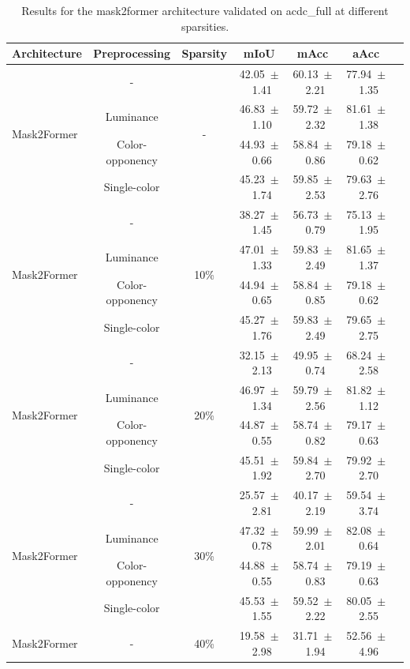 \begin{table}[h]
\centering
\caption{Results for the mask2former architecture validated on acdc_full at different sparsities.}
\begin{tabular}{@{}lccc ccc@{}}
\toprule
Architecture & Preprocessing & Sparsity & mIoU & mAcc & aAcc \\
\midrule

\multirow{4}{*}{Mask2Former} & - & \multirow{4}{*}{-} & 42.05~$\pm$~1.41 & 60.13~$\pm$~2.21 & 77.94~$\pm$~1.35 \\
& Luminance & & 46.83~$\pm$~1.10 & 59.72~$\pm$~2.32 & 81.61~$\pm$~1.38 \\
& Color-opponency & & 44.93~$\pm$~0.66 & 58.84~$\pm$~0.86 & 79.18~$\pm$~0.62 \\
& Single-color & & 45.23~$\pm$~1.74 & 59.85~$\pm$~2.53 & 79.63~$\pm$~2.76 \\
\midrule
\multirow{4}{*}{Mask2Former} & - & \multirow{4}{*}{10\%} & 38.27~$\pm$~1.45 & 56.73~$\pm$~0.79 & 75.13~$\pm$~1.95 \\
& Luminance & & 47.01~$\pm$~1.33 & 59.83~$\pm$~2.49 & 81.65~$\pm$~1.37 \\
& Color-opponency & & 44.94~$\pm$~0.65 & 58.84~$\pm$~0.85 & 79.18~$\pm$~0.62 \\
& Single-color & & 45.27~$\pm$~1.76 & 59.83~$\pm$~2.49 & 79.65~$\pm$~2.75 \\
\midrule
\multirow{4}{*}{Mask2Former} & - & \multirow{4}{*}{20\%} & 32.15~$\pm$~2.13 & 49.95~$\pm$~0.74 & 68.24~$\pm$~2.58 \\
& Luminance & & 46.97~$\pm$~1.34 & 59.79~$\pm$~2.56 & 81.82~$\pm$~1.12 \\
& Color-opponency & & 44.87~$\pm$~0.55 & 58.74~$\pm$~0.82 & 79.17~$\pm$~0.63 \\
& Single-color & & 45.51~$\pm$~1.92 & 59.84~$\pm$~2.70 & 79.92~$\pm$~2.70 \\
\midrule
\multirow{4}{*}{Mask2Former} & - & \multirow{4}{*}{30\%} & 25.57~$\pm$~2.81 & 40.17~$\pm$~2.19 & 59.54~$\pm$~3.74 \\
& Luminance & & 47.32~$\pm$~0.78 & 59.99~$\pm$~2.01 & 82.08~$\pm$~0.64 \\
& Color-opponency & & 44.88~$\pm$~0.55 & 58.74~$\pm$~0.83 & 79.19~$\pm$~0.63 \\
& Single-color & & 45.53~$\pm$~1.55 & 59.52~$\pm$~2.22 & 80.05~$\pm$~2.55 \\
\midrule
\multirow{4}{*}{Mask2Former} & - & \multirow{4}{*}{40\%} & 19.58~$\pm$~2.98 & 31.71~$\pm$~1.94 & 52.56~$\pm$~4.96 \\

\end{tabular}
\end{table}
